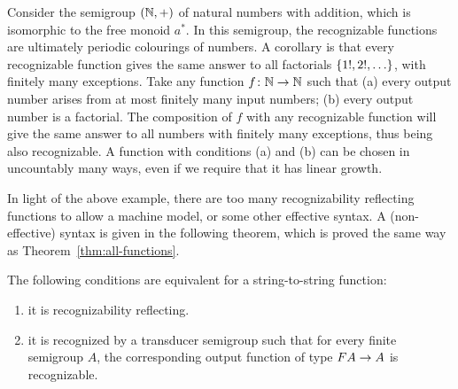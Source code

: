 \begin{example}[Factorials]
 Consider the semigroup $({\mathbb N}, +)$ of natural numbers with addition, which is isomorphic to the free monoid $a^*$. In this semigroup, the recognizable functions are ultimately periodic colourings of numbers. A corollary is that every recognizable function gives the same answer to all factorials $\{1!,2!,\ldots\}$, with finitely many exceptions. Take any function $f\colon {\mathbb N} \to {\mathbb N}$ such that (a) every output number arises from at most finitely many input numbers; (b) every output number is a factorial. The composition of $f$ with any recognizable function will give the same answer to all numbers with finitely many exceptions, thus being also recognizable. A function with conditions (a) and (b) can be chosen in uncountably many ways, even if we require that it has linear growth.
\end{example}

In light of the above example, there are too many recognizability reflecting functions to allow a machine model, or some other effective syntax. A (non-effective) syntax is given in the following theorem, which is proved the same way as Theorem~\ref{thm:all-functions}.

\begin{theorem}\label{thm:reco-reflecting-functions} The following conditions are equivalent for a string-to-string function:
 \begin{enumerate}
 \item \label{it:reco-refl} it is recognizability reflecting.
 \item \label{it:trans-semig-reco}it is recognized by a transducer semigroup such that for every finite semigroup $A$, the corresponding output function of type 
 $\functor A \to A$
 is recognizable.
 \end{enumerate}
\end{theorem}
